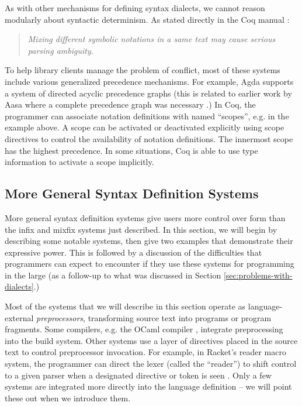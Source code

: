 As with other mechanisms for defining syntax dialects, we cannot reason modularly about syntactic determinism. As stated directly in the Coq manual \cite{Coq:manual}: 
\begin{quote}
\emph{Mixing different symbolic notations in a same text may cause serious parsing ambiguity.}
\end{quote}

To help library clients manage the problem of conflict, most of these systems include various generalized precedence mechanisms. For example, Agda supports a system of directed acyclic precedence graphs \cite{DBLP:conf/ifl/DanielssonN08} (this is related to earlier work by Aasa where a complete precedence graph was necessary \cite{DBLP:journals/tcs/Aasa95}.) In Coq, the programmer can associate notation definitions with named ``scopes'', e.g.  in the example above. A scope can  be activated or deactivated explicitly using scope directives to control the availability of notation definitions. The innermost scope has the highest precedence. In some situations, Coq is able to use type information to activate a scope implicitly.


\subsection{More General Syntax Definition Systems}\label{sec:syntax-dialects}
More general syntax definition systems give users more control over form than the infix and mixfix systems just described. In this section, we will begin by describing some notable systems, then give two examples that demonstrate their expressive power. This is followed by a discussion of the difficulties that programmers can expect to encounter if they  use these systems for programming in the large (as a follow-up to what was discussed in Section \ref{sec:problems-with-dialects}.)

Most of the systems that we will describe in this section operate as language-external \emph{preprocessors}, transforming source text into programs or program fragments. Some compilers, e.g. the OCaml compiler \cite{ocaml-manual}, integrate preprocessing into the build system. Other systems use a layer of directives placed in the source text to control preprocessor invocation. For example, in Racket's reader macro system, the programmer can direct the lexer (called the ``reader'') to shift control to a given parser when a designated directive or token is seen \cite{Flatt:2012:CLR:2063176.2063195}. Only a few systems are integrated more directly into the language definition -- we will point these out when we introduce them.

